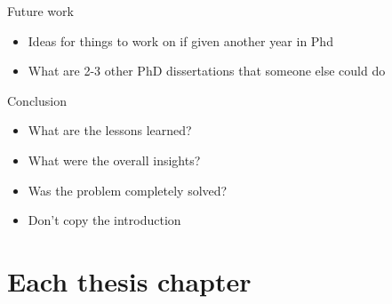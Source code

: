Future work
\begin{itemize}
    \item Ideas for things to work on if given another year in Phd
    \item What are 2-3 other PhD dissertations that someone else could do
\end{itemize}

Conclusion
\begin{itemize}
    \item What are the lessons learned?
    \item What were the overall insights?
    \item Was the problem completely solved? 
    \item Don't copy the introduction
\end{itemize}

\section{Each thesis chapter}
